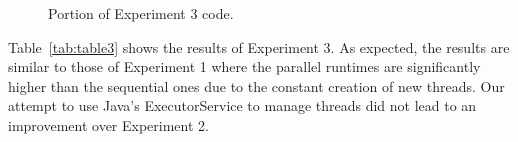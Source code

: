 \documentclass[conference]{IEEEtran}
\begin{document}
\begin{figure}[htbp]
\centerline{}
\caption{Portion of Experiment 3 code.}
\label{14}
\end{figure}

Table~\ref{tab:table3} shows the results of Experiment 3. As expected, the results are similar to those of Experiment 1 where the parallel runtimes are significantly higher than the sequential ones due to the constant creation of new threads. Our attempt to use Java's ExecutorService to manage threads did not lead to an improvement over Experiment 2.
\end{document}
